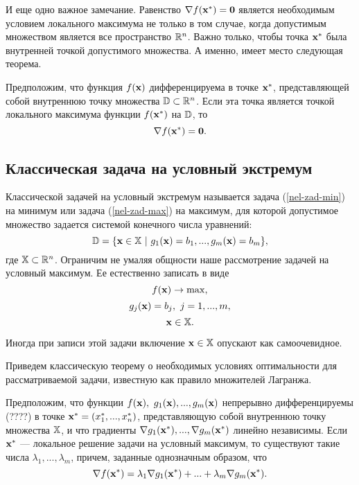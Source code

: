     И еще одно важное замечание. Равенство
    $\nabla f(\mathbf{x^{*}})=\mathbf{0}$ является необходимым условием
    локального максимума не только в том случае, когда допустимым
    множеством является все пространство $\mathbb{R}^{n}$. Важно только,
    чтобы точка $\mathbf{x^{*}}$ была внутренней точкой допустимого
    множества. А именно, имеет место следующая теорема.

\begin{teo} \label{nul-grad-neobh}
    Предположим, что функция $f(\mathbf{x})$ дифференцируема в точке
    $\mathbf{x^{*}}$, представляющей собой внутреннюю точку множества
    $\mathbb{D}\subset\mathbb{R}^{n}$. Если эта точка является точкой локального
    максимума функции $f(\mathbf{x^{*}})$ на $\mathbb{D}$, то
    \[\nabla f(\mathbf{x^{*}})=\mathbf{0}.\]
\end{teo}


\subsection{Классическая задача на условный экстремум}

    Классической задачей на условный экстремум называется задача
(\ref{nel-zad-min}) на минимум или задача
    (\ref{nel-zad-max}) на максимум, для которой допустимое множество задается
    системой конечного числа уравнений:
    \[\st{D}=\{\vc{x}\in\st{X} \ | \ g_{1}(\vc{x})=b_{1},...,g_{m}(\vc{x})=b_{m}\},\]
    где $\mathbb{X}\subset\mathbb{R}^{n}$.
    Ограничим не умаляя общности наше рассмотрение задачей на условный максимум.
    Ее естественно записать в виде
\[
    f(\mathbf{x})\rightarrow\max,
\]
\[
    g_{j}(\mathbf{x})=b_{j}, \ j=1,...,m,
\]
\[
    \mathbf{x}\in\mathbb{X}.
\]

    Иногда при записи этой задачи включение $\mathbf{x}\in\mathbb{X}$
     опускают как самоочевидное.


    Приведем классическую теорему о необходимых условиях
    оптимальности для рассматриваемой задачи, известную как правило множителей
    Лагранжа.

\begin{teo}
    \label{class-mno-la}
   Предположим, что функции $f(\mathbf{x}), \
    g_{1}(\mathbf{x}),...,g_{m}(\mathbf{x})$  непрерывно дифференцируемы (????) в
    точке $\mathbf{x^{*}}=(x^{*}_{1},...,x^{*}_{n})$, представляющую собой
    внутреннюю точку множества $\mathbb{X}$, и что градиенты
    $\nabla g_{1}(\mathbf{x^{*}}),...,\nabla g_{m}(\mathbf{x^{*}})$
    линейно независимы. Если $\mathbf{x^{*}}$ --- локальное решение
    задачи на условный максимум, то существуют такие  числа
    $\lambda_{1},...,\lambda_{m}$, причем, заданные однозначным
    образом, что
\begin{equation}
    \label{razloj-grad}
    \nabla f(\mathbf{x^{*}})=\lambda_{1}\nabla g_{1}(\mathbf{x^{*}})+...
    +\lambda_{m}\nabla g_{m}(\mathbf{x^{*}}).
\end{equation}
\end{teo}

